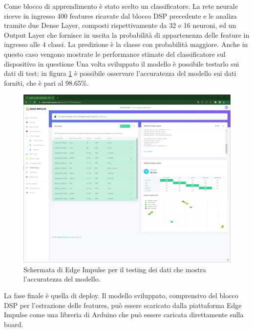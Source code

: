 Come blocco di apprendimento è stato scelto un classificatore. La rete neurale riceve in ingresso 400 features ricavate dal blocco DSP precedente e le analiza tramite due Dense Layer, composti rispettivamente da 32 e 16 neuroni, ed un Output Layer che fornisce in uscita la probabilità di appartenenza delle feature in ingresso alle 4 classi. La predizione è la classe con probabilità maggiore. Anche in questo caso vengono mostrate le performance stimate del classificatore sul dispositivo in questione
Una volta sviluppato il modello è possibile testarlo sui dati di test: in figura \ref{fig:model_test} è possibile osservare l'accuratezza del modello sui dati forniti, che è pari al 98.65\%. 
\begin{figure}[h!]
	\centering
	\includegraphics[width=0.5\linewidth]{./ImageFiles/model_test.jpg}
	\caption{Schermata di Edge Impulse per il testing dei dati che mostra l'accuratezza del modello.}
	\label{fig:model_test}
\end{figure}
La fase finale è quella di deploy. Il modello sviluppato, comprensivo del blocco DSP per l'estrazione delle features, può essere scaricato dalla piattaforma Edge Impulse come una libreria di Arduino che può essere caricata direttamente sulla board. 

